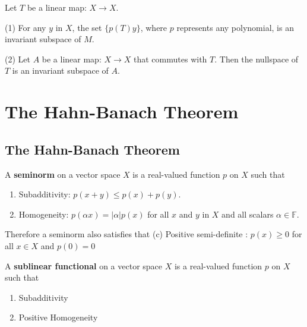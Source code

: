 \documentclass[12pt, oneside]{book}
\begin{document}
\begin{theorem}
    Let $T$ be a linear map: $X \rightarrow X$.

    (1) For any $y$ in $X$, the set $\{p(T) y\}$, where $p$ represents any polynomial, is an invariant subspace of $M$.

    (2) Let $A$ be a linear map: $X \rightarrow X$ that commutes with $T$.
    Then the nullspace of $T$ is an invariant subspace of $A$.
\end{theorem}





\chapter{The Hahn-Banach Theorem}

\section{The Hahn-Banach Theorem} %

\begin{definition}
    A \textbf{seminorm} on a vector space $X$ is a real-valued function $p$ on $X$ such that
    \begin{enumerate}[label=(\roman*)]
        \item Subadditivity: $p(x+y) \leq p(x)+p(y)$.
        \item Homogeneity: $p(\alpha x)=|\alpha| p(x)$ for all $x$ and $y$ in $X$ and all scalars $\alpha \in \mathbb{F}$.
    \end{enumerate}
    Therefore a seminorm also satisfies that (c)
    Positive semi-definite : $p(x)\geq 0$ for all $x\in X$ and $p(0)=0$
\end{definition}

\begin{definition}
    A \textbf{sublinear functional} on a vector space $X$ is a real-valued function $p$ on $X$ such that

    \begin{enumerate}[label=(\roman*)]
        \item Subadditivity
        \item Positive Homogeneity
    \end{enumerate}
\end{definition}
\end{document}
